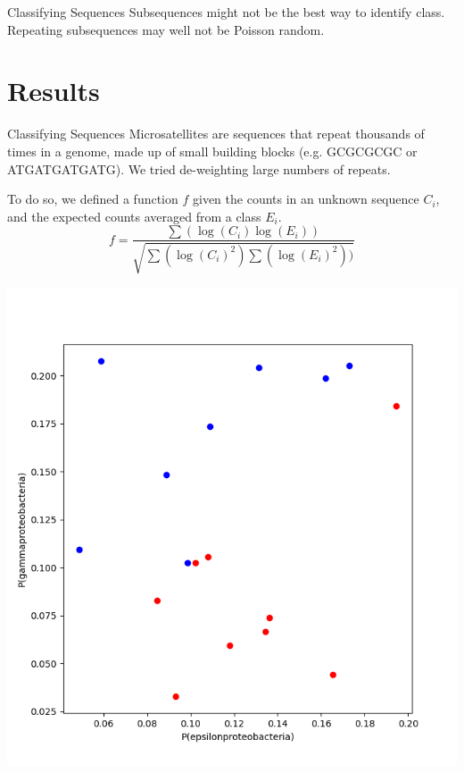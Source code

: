 \documentclass[12pt]{beamer}
\begin{document}
	\begin{frame}{Classifying Sequences}
		Subsequences might not be the best way to identify class.
		\vfill
		Repeating subsequences may well not be Poisson random.
	\end{frame}

	\section{Results}
	\begin{frame}{Classifying Sequences}
		Microsatellites are sequences that repeat thousands of times in a genome, made up of small building blocks (e.g. GCGCGCGC or ATGATGATGATG).
		\vfill
		We tried de-weighting large numbers of repeats.
	\end{frame}

	\begin{frame}{}
		To do so, we defined a function $f$ given the counts in an unknown sequence $C_{i}$, and the expected counts averaged from a class $E_{i}$. \vfill
		\begin{equation}
			f = \frac{\sum( \log(C_{i})  \log(E_{i}) )}{\sqrt{\sum(\log(C_{i})^{2})    \sum(\log(E_{i})^{2}))}}
		\end{equation}
	\end{frame}

	\begin{frame}{}
		\begin{center}
			\includegraphics[scale=0.35]{func_test_2.png}
		\end{center}
	\end{frame}
\end{document}
